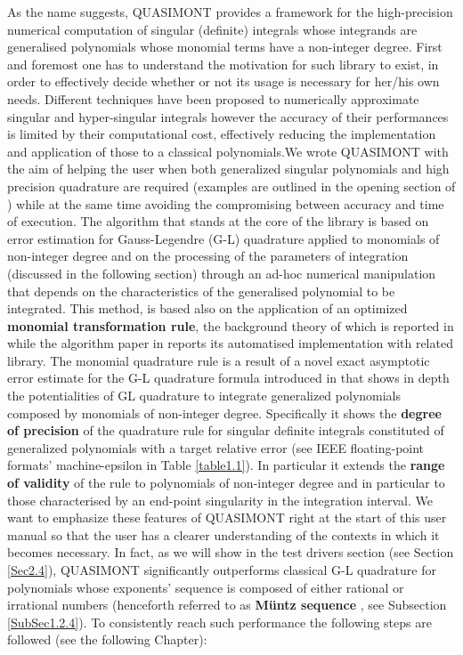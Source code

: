 \documentclass[a4paper, twosided]{book}
\begin{document}
\noindent
As the name suggests, QUASIMONT provides a framework for the high-precision numerical computation of singular (definite) integrals whose integrands are generalised polynomials whose monomial terms have a non-integer degree. First and foremost one has to understand the motivation for such library to exist, in order to effectively decide whether or not its usage is necessary for her/his own needs. Different techniques have been proposed to numerically approximate singular and hyper-singular integrals however the accuracy of their performances is limited by their computational cost, effectively reducing the implementation and application of those to a classical polynomials.We wrote QUASIMONT with the aim of helping the user when both generalized singular polynomials and high precision quadrature are required (examples are outlined in the opening section of \cite{Lombardi21}) while at the same time avoiding the compromising between accuracy and time of execution. The algorithm that stands at the core of the library is based on error estimation for Gauss-Legendre (G-L) quadrature applied to monomials of non-integer degree and on  the processing of the parameters of integration (discussed in the following section) through an ad-hoc numerical manipulation that depends on the characteristics of the generalised polynomial to be integrated. This method, is based also on the application of an optimized \color{poliDarkBlue} \textbf{monomial transformation rule}\color{black}, the background theory of which is reported in \cite{Lombardi09} while the algorithm paper in \cite{Lombardi21} reports its automatised implementation with related library. The monomial quadrature rule is a result of a novel exact asymptotic error estimate for the G-L quadrature formula introduced in \cite{Lombardi09} that shows in depth the potentialities of GL quadrature to integrate generalized polynomials composed by monomials of non-integer degree. Specifically it shows the \color{poliDarkBlue} \textbf{degree of precision} \color{black} of the quadrature rule for singular definite integrals constituted of generalized polynomials with a target relative error (see IEEE floating-point formats' machine-epsilon in Table \ref{table1.1}). In particular it extends the \color{poliDarkBlue} \textbf{range of validity} \color{black} of the rule to polynomials of non-integer degree and in particular to those characterised by an end-point singularity in the integration interval. We want to emphasize these features of QUASIMONT right at the start of this user manual so that the user has a clearer understanding of the contexts in which it becomes necessary. In fact, as we will show in the test drivers section (see Section \ref{Sec2.4}), QUASIMONT significantly outperforms classical G-L quadrature for polynomials whose exponents' sequence is composed of either rational or irrational numbers (henceforth referred to as \color{poliDarkBlue} \textbf{Müntz sequence} \color{black}, see Subsection \ref{SubSec1.2.4}). To consistently reach such performance the following steps are followed (see the following Chapter):
\end{document}
